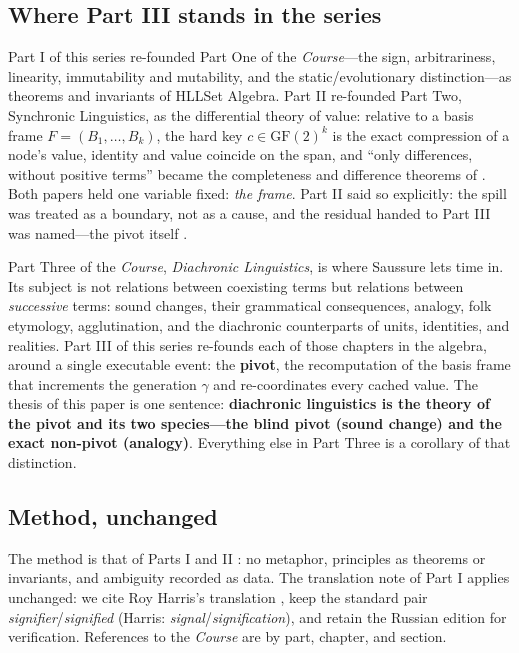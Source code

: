 \documentclass[11pt,a4paper]{article}
\theoremstyle{remark}
\newcommand{\Gen}{\ensuremath{\gamma}}                   %
\begin{document}
\subsection{Where Part III stands in the series}

Part I of this series \cite{part1} re-founded Part One of the
\textit{Course}---the sign, arbitrariness, linearity, immutability and
mutability, and the static/evolutionary distinction---as theorems and
invariants of HLLSet Algebra. Part II \cite{part2} re-founded Part Two,
Synchronic Linguistics, as the differential theory of value: relative to a
basis frame $F=(B_1,\dots,B_k)$, the hard key $c \in \mathrm{GF}(2)^k$ is the
exact compression of a node's value, identity and value coincide on the span,
and ``only differences, without positive terms'' became the completeness and
difference theorems of \cite{part2}. Both papers held one variable fixed: \emph{the
frame}. Part II said so explicitly: the spill was treated as a boundary, not
as a cause, and the residual handed to Part III was named---the pivot itself
\cite{part2}.

Part Three of the \textit{Course}, \emph{Diachronic Linguistics}, is where
Saussure lets time in. Its subject is not relations between coexisting terms
but relations between \emph{successive} terms: sound changes, their
grammatical consequences, analogy, folk etymology, agglutination, and the
diachronic counterparts of units, identities, and realities. Part III of this
series re-founds each of those chapters in the algebra, around a single
executable event: the \textbf{pivot}, the recomputation of the basis frame
that increments the generation $\Gen$ and re-coordinates every cached value.
The thesis of this paper is one sentence: \textbf{diachronic linguistics is
the theory of the pivot and its two species---the blind pivot (sound change)
and the exact non-pivot (analogy)}. Everything else in Part Three is a
corollary of that distinction.

\subsection{Method, unchanged}

The method is that of Parts I and II \cite{part1,part2}: no metaphor,
principles as theorems or invariants, and ambiguity recorded as data. The
translation note of Part I applies unchanged: we cite Roy Harris's
translation \cite{harris1983}, keep the standard pair
\emph{signifier}/\emph{signified} (Harris: \emph{signal}/\emph{signification}),
and retain the Russian edition \cite{saussure1977} for verification.
References to the \textit{Course} are by part, chapter, and section.
\end{document}
